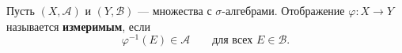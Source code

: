\label{definition:27}

\begin{definition}
Пусть $(X,\mathcal A)$ и $(Y,\mathcal B)$ --- множества с $\sigma$-алгебрами.
Отображение $\varphi:X\to Y$ называется \textbf{измеримым}, если
\[
  \varphi^{-1}(E)\in\mathcal A\qquad\text{для всех }E\in\mathcal B.
\]
\end{definition}
